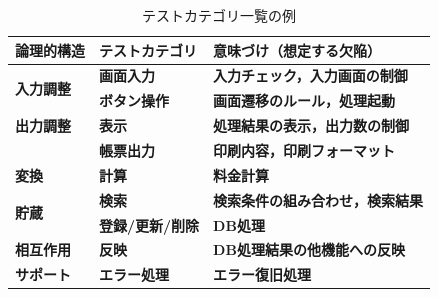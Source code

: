\documentclass[a4paper,12pt]{jreport}
\begin{document}
\begin{table}[htbp]
  \centering
  \caption{テストカテゴリ一覧の例}
    \begin{tabular}{|p{6em}|p{8.07em}|p{14.645em}|}
    \hline
    \textbf{論理的構造} & \textbf{テストカテゴリ} & \textbf{意味づけ（想定する欠陥）} \bigstrut\\
    \hline
    \multirow{2}[4]{*}{\textbf{入力調整}} & \textbf{画面入力} & \textbf{入力チェック，入力画面の制御} \bigstrut\\
\cline{2-3}    \multicolumn{1}{|l|}{} & \textbf{ボタン操作} & \textbf{画面遷移のルール，処理起動} \bigstrut\\
    \hline
    \textbf{出力調整} & \textbf{表示} & \textbf{処理結果の表示，出力数の制御} \bigstrut\\
    \hline
    \multicolumn{1}{|r|}{} & \textbf{帳票出力} & \textbf{印刷内容，印刷フォーマット} \bigstrut\\
    \hline
    \textbf{変換} & \textbf{計算} & \textbf{料金計算} \bigstrut\\
    \hline
    \multirow{2}[4]{*}{\textbf{貯蔵}} & \textbf{検索} & \textbf{検索条件の組み合わせ，検索結果} \bigstrut\\
\cline{2-3}    \multicolumn{1}{|l|}{} & \textbf{登録/更新/削除} & \textbf{DB処理} \bigstrut\\
    \hline
    \textbf{相互作用} & \textbf{反映} & \textbf{DB処理結果の他機能への反映} \bigstrut\\
    \hline
    \textbf{サポート} & \textbf{エラー処理} & \textbf{エラー復旧処理} \bigstrut\\
    \hline
    \end{tabular}%
  \label{tbl:D-4-tbl1}%
\end{table}%
\end{document}
